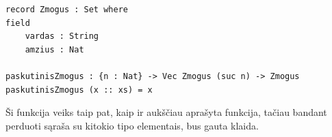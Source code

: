 \documentclass{VUMIFPSkursinis}
\begin{document}
\begin{lstlisting}
record Zmogus : Set where
field
	vardas : String
	amzius : Nat

paskutinisZmogus : {n : Nat} -> Vec Zmogus (suc n) -> Zmogus
paskutinisZmogus (x :: xs) = x	
	\end{lstlisting}
Ši funkcija veiks taip pat, kaip ir aukščiau aprašyta funkcija, tačiau bandant perduoti sąraša su kitokio tipo elementais, bus gauta klaida.	
\end{document}
